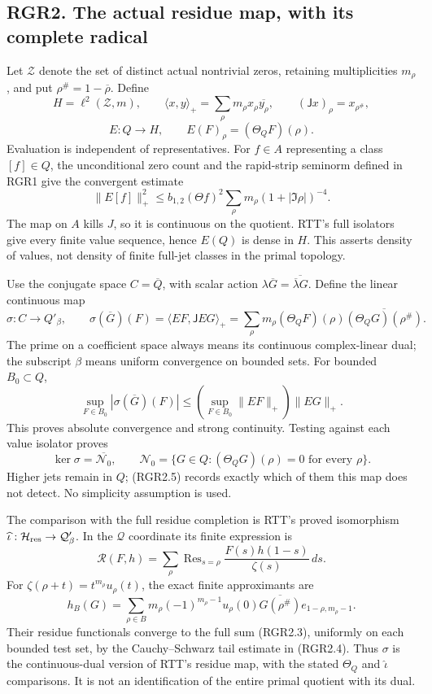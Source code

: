 \subsection{RGR2. The actual residue map, with its complete
radical}\label{rgr2.-the-actual-residue-map-with-its-complete-radical}

Let \(\mathscr Z\) denote the set of distinct actual nontrivial zeros,
retaining multiplicities \(m_\rho\), and put
\(\rho^\#=1-\overline\rho\). Define \[
 H=\ell^2(\mathscr Z,m),\qquad
 \langle x,y\rangle_+=\sum_\rho m_\rho x_\rho\overline{y_\rho},
 \qquad (\mathsf Jx)_\rho=x_{\rho^\#},
\] \[
 E:Q\longrightarrow H,\qquad E(F)_\rho=(\Theta_QF)(\rho).
 \tag{RGR2.1}
\] Evaluation is independent of representatives. For \(f\in A\)
representing a class \([f]\in Q\), the unconditional zero count and the
rapid-strip seminorm defined in RGR1 give the convergent estimate \[
 \|E[f]\|_+^2\le b_{1,2}(\Theta f)^2
 \sum_\rho m_\rho(1+|\Im\rho|)^{-4}.
 \tag{RGR2.2}
\] The map on \(A\) kills \(J\), so it is continuous on the quotient.
RTT's full isolators give every finite value sequence, hence \(E(Q)\) is
dense in \(H\). This asserts density of values, not density of finite
full-jet classes in the primal topology.

Use the conjugate space \(C=\overline Q\), with scalar action
\(\lambda\overline G=\overline{\overline\lambda G}\). Define the linear
continuous map \[
 \sigma:C\longrightarrow Q'_\beta,\qquad
 \sigma(\overline G)(F)
 =\langle EF,\mathsf JEG\rangle_+
 =\sum_\rho m_\rho(\Theta_QF)(\rho)
       \overline{(\Theta_QG)(\rho^\#)}.
 \tag{RGR2.3}
\] The prime on a coefficient space always means its continuous
complex-linear dual; the subscript \(\beta\) means uniform convergence
on bounded sets. For bounded \(B_0\subset Q\), \[
 \sup_{F\in B_0}|\sigma(\overline G)(F)|
 \le\left(\sup_{F\in B_0}\|EF\|_+\right)\|EG\|_+.
 \tag{RGR2.4}
\] This proves absolute convergence and strong continuity. Testing
against each value isolator proves \[
 \ker\sigma=\overline{\mathcal N_0},\qquad
 \mathcal N_0=\{G\in Q:(\Theta_QG)(\rho)=0\text{ for every }\rho\}.
 \tag{RGR2.5}
\] Higher jets remain in \(Q\); (RGR2.5) records exactly which of them
this map does not detect. No simplicity assumption is used.

The comparison with the full residue completion is RTT's proved
isomorphism \(\widehat\iota:\mathcal H_{\rm res}\to\mathcal Q'_\beta\).
In the \(\mathcal Q\) coordinate its finite expression is \[
 \mathcal R(F,h)=\sum_\rho\operatorname{Res}_{s=\rho}
          \frac{F(s)h(1-s)}{\zeta(s)}\,ds.
 \tag{RGR2.6}
\] For \(\zeta(\rho+t)=t^{m_\rho}u_\rho(t)\), the exact finite
approximants are \[
 h_B(G)=\sum_{\rho\in B}m_\rho(-1)^{m_\rho-1}u_\rho(0)
       \overline{G(\rho^\#)}e_{1-\rho,m_\rho-1}.
 \tag{RGR2.7}
\] Their residue functionals converge to the full sum (RGR2.3),
uniformly on each bounded test set, by the Cauchy--Schwarz tail estimate
in (RGR2.4). Thus \(\sigma\) is the continuous-dual version of RTT's
residue map, with the stated \(\Theta_Q\) and \(\widehat\iota\)
comparisons. It is not an identification of the entire primal quotient
with its dual.

